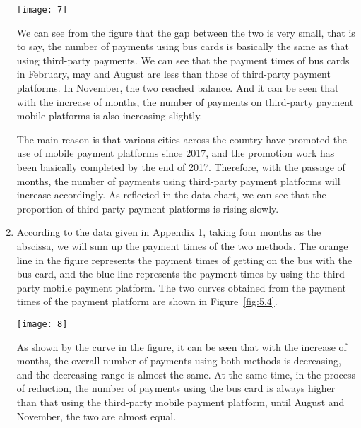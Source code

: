 \documentclass[../mcmpaper]{subfiles}
\begin{document}
\begin{enumerate}[label=\arabic*., format=\bfseries, itemindent=0pt, leftmargin=0pt, topsep=0pt, listparindent=\parindent, itemsep=1pt]
\begin{minipage}{1.0\linewidth}
    \centering
    \texttt{[image: 7]}
    \label{fig:5.3}
\end{minipage}
\par
We can see from the figure that the gap between the two is very small, that is to say, the number of payments using bus cards is basically the same as that using third-party payments. We can see that the payment times of bus cards in February, may and August are less than those of third-party payment platforms. In November, the two reached balance. And it can be seen that with the increase of months, the number of payments on third-party payment mobile platforms is also increasing slightly.
\par
The main reason is that various cities across the country have promoted the use of mobile payment platforms since 2017, and the promotion work has been basically completed by the end of 2017. Therefore, with the passage of months, the number of payments using third-party payment platforms will increase accordingly. As reflected in the data chart, we can see that the proportion of third-party payment platforms is rising slowly.
    \item According to the data given in Appendix 1, taking four months as the abscissa, we will sum up the payment times of the two methods. The orange line in the figure represents the payment times of getting on the bus with the bus card, and the blue line represents the payment times by using the third-party mobile payment platform. The two curves obtained from the payment times of the payment platform are shown in Figure~\ref{fig:5.4}.\\
\begin{minipage}{1.0\linewidth}
    \centering
    \texttt{[image: 8]}
    \label{fig:5.4}
\end{minipage}
\par
As shown by the curve in the figure, it can be seen that with the increase of months, the overall number of payments using both methods is decreasing, and the decreasing range is almost the same. At the same time, in the process of reduction, the number of payments using the bus card is always higher than that using the third-party mobile payment platform, until August and November, the two are almost equal.

\end{enumerate}
\end{document}
